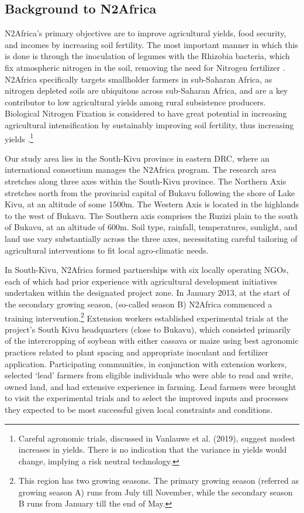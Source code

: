 \subsection{Background to N2Africa}
N2Africa’s primary objectives are to improve agricultural yields, food security, and incomes by increasing soil fertility. The most important manner in which this is done is through the inoculation of legumes with the Rhizobia bacteria, which fix atmospheric nitrogen in the soil, removing the need for Nitrogen fertilizer \citep{Wagner2012,Mulongoy1992}. N2Africa specifically targets smallholder farmers in sub-Saharan Africa, as nitrogen depleted soils are ubiquitous across sub-Saharan Africa, and are a key contributor to low agricultural yields among rural subsistence producers. Biological Nitrogen Fixation is considered to have great potential in increasing agricultural intensification by sustainably improving soil fertility, thus increasing yields \citep{Peoples1995}.\footnote{Careful agronomic trials, discussed in Vanlauwe et al. (2019), suggest modest increases in yields. There is no indication that the variance in yields would change, implying a risk neutral technology.}

Our study area lies in the South-Kivu province in eastern DRC, where an international consortium manages the N2Africa program. The research area stretches along three axes within the South-Kivu province. The Northern Axis stretches north from the provincial capital of Bukavu following the shore of Lake Kivu, at an altitude of some 1500m. The Western Axis is located in the highlands to the west of Bukavu. The Southern axis comprises the Ruzizi plain to the south of Bukavu, at an altitude of 600m. Soil type, rainfall, temperatures, sunlight, and land use vary substantially across the three axes, necessitating careful tailoring of agricultural interventions to fit local agro-climatic needs.

In South-Kivu, N2Africa formed partnerships with six locally operating NGOs, each of which had prior experience with agricultural development initiatives undertaken within the designated project zone. In January 2013, at the start of the secondary growing season, (so-called season B)  N2Africa commenced a training intervention.\footnote{This region has two growing seasons. The primary growing season (referred as growing season A) runs from July till November, while the secondary season B runs from January till the end of May.}  Extension workers established experimental trials at the project’s South Kivu headquarters (close to Bukavu), which consisted primarily of the intercropping of soybean with either cassava or maize using best agronomic practices related to plant spacing and appropriate inoculant and fertilizer application. Participating communities, in conjunction with extension workers, selected ‘lead’ farmers from eligible individuals who were able to read and write, owned land, and had extensive experience in farming. Lead farmers were brought to visit the experimental trials and to select the improved inputs and processes they expected to be most successful given local constraints and conditions.

